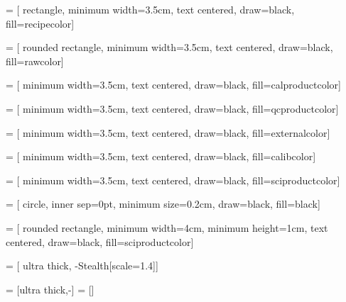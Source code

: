 



 = [%
  rectangle,
  minimum width=3.5cm,
  text centered,
  draw=black,
  fill=recipecolor]

 = [%
  rounded rectangle,
  minimum width=3.5cm,
  text centered,
  draw=black,
  fill=rawcolor]

 = [%
  minimum width=3.5cm,
  text centered,
  draw=black,
  fill=calproductcolor]

 = [%
  minimum width=3.5cm,
  text centered,
  draw=black,
  fill=qcproductcolor]

 = [%
  minimum width=3.5cm,
  text centered,
  draw=black,
  fill=externalcolor]

 = [%
  minimum width=3.5cm,
  text centered,
  draw=black,
  fill=calibcolor]

 = [
  minimum width=3.5cm,
  text centered,
  draw=black,
  fill=sciproductcolor]

 = [%
  circle,
  inner sep=0pt,
  minimum size=0.2cm,
  draw=black,
  fill=black]  %

 = [%
  rounded rectangle,
  minimum width=4cm,
  minimum height=1cm,
  text centered,
  draw=black,
  fill=sciproductcolor]

 = [%
  ultra thick,
  {-Stealth[scale=1.4]}]

 = [ultra thick,-]
 = []

\newcommand{\recipebox}[2]{%
  \begin{tcolorbox}[%
    hbox,
    colbacktitle=titlebackcolor,
    coltitle=black,
    colback=recipecolor,
    adjusted title={\centering #1},
    halign=center]
    #2
  \end{tcolorbox}
}

\newcommand{\recipenotitlebox}[1]{%
  \begin{tcolorbox}[%
    hbox,
    colback=recipecolor,
    halign=center]
    #1
  \end{tcolorbox}
}
